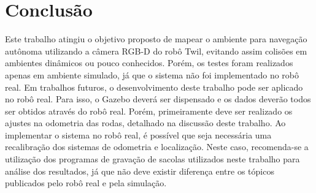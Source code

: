 \documentclass[repeatfields,xlists,xpacks,oneside,yearsonly]{ufrgscca}
\begin{document}

\chapter{Conclusão}
\label{conclusao}

Este trabalho atingiu o objetivo proposto de mapear o ambiente para
navegação autônoma utilizando a câmera RGB-D do robô Twil, evitando
assim colisões em ambientes dinâmicos ou pouco conhecidos. Porém, os
testes foram realizados apenas em ambiente simulado, já que o sistema
não foi implementado no robô real. Em trabalhos futuros, o
desenvolvimento deste trabalho pode ser aplicado no robô real. Para
isso, o Gazebo deverá ser dispensado e os dados deverão todos ser
obtidos através do robô real. Porém, primeiramente deve ser realizado
os ajustes na odometria das rodas, detalhado na discussão deste
trabalho. Ao implementar o sistema no robô real, é possível que seja
necessária uma recalibração dos sistemas de odometria e localização.
Neste caso, recomenda-se a utilização dos programas de gravação de
sacolas utilizados neste trabalho para análise dos resultados, já que
não deve existir diferença entre os tópicos publicados pelo robô real
e pela simulação.

\printbibliography

%
%
%
\end{document}
